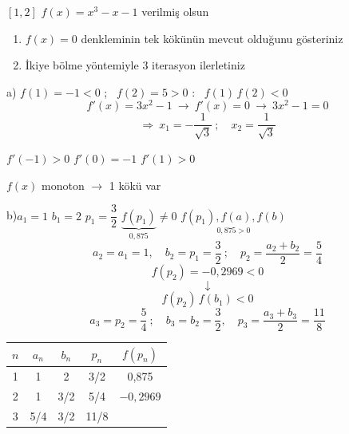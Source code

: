 \documentclass[11pt,a4paper]{article}
\begin{document}
\begin{ornek}[1]
$[1,2]$ \qquad $f(x)=x^3-x-1$ verilmiş olsun
\begin{enumerate}[label=\alph*)]
  \item $f(x)=0$ denkleminin tek kökünün mevcut olduğunu gösteriniz
  \item İkiye bölme yöntemiyle 3 iterasyon ilerletiniz
\end{enumerate}
\end{ornek}

a) $f(1)=-1<0$ ; \ $f(2)=5>0$ : \ $f(1)\,f(2)<0$
\[
  f'(x)=3x^2-1 \ \rightarrow\ f'(x)=0 \ \rightarrow\ 3x^2-1=0
\]
\[
  \Rightarrow\ x_1=-\frac{1}{\sqrt3}\ ;\quad x_2=\frac{1}{\sqrt3}
\]

\noindent\begin{minipage}[c]{0.55\linewidth}
\centering
{}

$f'(-1)>0$ \qquad $f'(0)=-1$ \qquad $f'(1)>0$
\end{minipage}\hfill
\begin{minipage}[c]{0.42\linewidth}
$f(x)$ monoton $\rightarrow$ 1 kökü var
\end{minipage}

\medskip
b)\quad $a_1=1$ \qquad $b_1=2$ \qquad $p_1=\dfrac32$ \qquad
$\underbrace{f(p_1)}_{0,875}\neq 0$ \qquad
$\underset{\textstyle 0{,}875>0}{f(p_1),f(a),f(b)}$
\[
  a_2=a_1=1,\quad b_2=p_1=\frac32\ ;\quad p_2=\frac{a_2+b_2}{2}=\frac54
\]
\[
  f(p_2)=-0{,}2969<0
\]
\[
  \downarrow
\]
\[
  f(p_2)\,f(b_1)<0
\]
\[
  a_3=p_2=\frac54\ ;\quad b_3=b_2=\frac32,\quad p_3=\frac{a_3+b_3}{2}=\frac{11}{8}
\]
\begin{center}
\begin{tabular}{ccccc}
  \toprule
  $n$ & $a_n$ & $b_n$ & $p_n$ & $f(p_n)$\\ \midrule
  1 & 1 & 2 & 3/2 & 0,875\\
  2 & 1 & 3/2 & 5/4 & $-0{,}2969$\\
  3 & 5/4 & 3/2 & 11/8 & \\ \bottomrule
\end{tabular}
\end{center}
\end{document}
